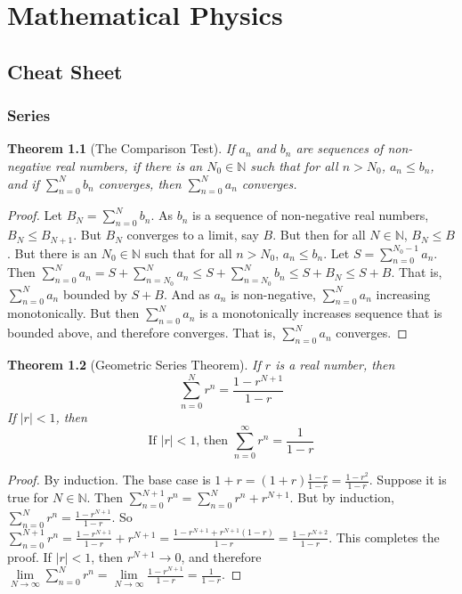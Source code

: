 \documentclass[oneside]{book}
\theoremstyle{mystyle}
\newtheorem*{theorem*}{Theorem}
\begin{document}
\chapter{Mathematical Physics}
\section{Cheat Sheet}
\subsection{Series}
\begin{theorem*}[The Comparison Test]
If $a_n$ and $b_n$ are sequences of non-negative real numbers, if there is an $N_0\in \mathbb{N}$ such that for all $n>N_0$, $a_n\leq b_n$, and if $\sum_{n=0}^{N}b_n$ converges, then $\sum_{n=0}^{N}a_n$ converges.
\end{theorem*}
\begin{proof}
Let $B_N = \sum_{n=0}^{N}b_n$. As $b_n$ is a sequence of non-negative real numbers, $B_{N}\leq B_{N+1}$. But $B_{N}$ converges to a limit, say $B$. But then for all $N\in \mathbb{N}$, $B_{N} \leq B$. But there is an $N_{0}\in \mathbb{N}$ such that for all $n>N_{0}$, $a_n\leq b_n$. Let $S = \sum_{n=0}^{N_{0}-1}a_n$. Then $\sum_{n=0}^{N}a_n = S+\sum_{n=N_{0}}^{N}a_n \leq S+\sum_{n=N_{0}}^{N}b_n \leq S+B_{N} \leq S+B$. That is, $\sum_{n=0}^{N}a_n$ bounded by $S+B$. And as $a_n$ is non-negative, $\sum_{n=0}^{N}a_n$ increasing monotonically. But then $\sum_{n=0}^{N}a_n$ is a monotonically increases sequence that is bounded above, and therefore converges. That is, $\sum_{n=0}^{N}a_n$ converges.
\end{proof}
\begin{theorem*}[Geometric Series Theorem]
If $r$ is a real number, then
\begin{equation}
    \nonumber \sum_{n=0}^{N} r^n = \frac{1-r^{N+1}}{1-r}
\end{equation}
If $|r|<1$, then
\begin{equation}
    \nonumber \textrm{If $|r|<1$, then } \sum_{n=0}^{\infty} r^n = \frac{1}{1-r}
\end{equation}
\end{theorem*}
\begin{proof}
By induction. The base case is $1+r = (1+r)\frac{1-r}{1-r} = \frac{1-r^2}{1-r}$. Suppose it is true for $N \in \mathbb{N}$. Then $\sum_{n=0}^{N+1}r^n = \sum_{n=0}^{N}r^n + r^{N+1}$. But by induction, $\sum_{n=0}^{N}r^n = \frac{1 - r^{N+1}}{1-r}$. So $\sum_{n=0}^{N+1}r^n = \frac{1-r^{N+1}}{1-r} + r^{N+1} = \frac{1-r^{N+1} + r^{N+1}(1-r)}{1-r} = \frac{1 - r^{N+2}}{1-r}$. This completes the proof. If $|r|<1$, then $r^{N+1} \rightarrow 0$, and therefore $\underset{N \rightarrow \infty}\lim \sum_{n=0}^{N}r^n = \underset{N\rightarrow \infty}\lim \frac{1-r^{N+1}}{1-r} = \frac{1}{1-r}$.
\end{proof}
\end{document}
